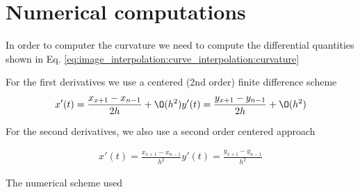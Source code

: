 \appendix
\section{Numerical computations}

In order to computer the curvature we need to compute the differential quantities shown in Eq. \ref{eq:image_interpolation:curve_interpolation:curvature} 

For the first derivatives we use a centered (2nd order) finite difference scheme
\begin{eqnarray}
	x'(t)=\frac{x_{x+1}-x_{n-1}}{2h}+\O(h^2)
	y'(t)=\frac{y_{x+1}-y_{n-1}}{2h}+\O(h^2)
\end{eqnarray}

For the second derivatives, we also use a second order centered approach

\begin{eqnarray}
	x'(t)=\frac{x_{x+1}-x_{n-1}}{h^2}
	y'(t)=\frac{y_{x+1}-y_{n-1}}{h^2}
\end{eqnarray}

The numerical scheme used 
\cite{math:computational_geometry:2006:comparison_of_numerical_techniques_for_euclidean_curvature}
